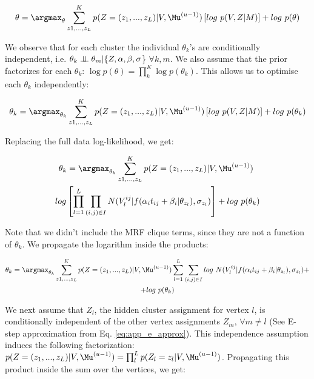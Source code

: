 \begin{equation}
 \theta = \argmax_{\theta} \sum_{z1,\dots, z_L}^K p(Z = (z_1, ..., z_L) | V, \Mu^{(u-1)}) \left[ log\ p(V,Z|M) \right] + log\ p(\theta)
\end{equation}

We observe that for each cluster the individual $\theta_k$'s are conditionally independent, i.e. $\theta_k \perp\!\!\!\perp \theta_m | \{Z, \alpha, \beta, \sigma$\} $\forall k,m$. We also assume that the prior factorizes for each $\theta_k$: $\log p(\theta) = \prod_k^K \log p(\theta_k)$. This allows us to optimise each $\theta_k$ independently:

\begin{equation}
 \theta_k = \argmax_{\theta_k} \sum_{z1,\dots, z_L}^K p(Z = (z_1, ..., z_L) | V, \Mu^{(u-1)}) \left[ log\ p(V,Z|M) \right] + log\ p(\theta_k)
\end{equation}

Replacing the full data log-likelihood, we get:

\begin{multline}
 \theta_k = \argmax_{\theta_k} \sum_{z1,\dots, z_L}^K p(Z = (z_1, ..., z_L) | V, \Mu^{(u-1)})\ \\ log \left[ \prod_{l=1}^L \prod_{(i,j) \in I} N(V_l^{ij} | f(\alpha_i t_{ij} + \beta_i | \theta_{z_l}), \sigma_{z_l}) \right]  + log\ p(\theta_k)
\end{multline}

Note that we didn't include the MRF clique terms, since they are not a function of $\theta_k$. We propagate the logarithm inside the products:

\begin{multline}
 \theta_k = \argmax_{\theta_k} \sum_{z1,\dots, z_L}^K p(Z = (z_1, ..., z_L) | V, \Mu^{(u-1)}) \sum_{l=1}^L \sum_{(i,j) \in I} log\ N(V_l^{ij} | f(\alpha_i t_{ij} + \beta_i | \theta_{z_l}), \sigma_{z_l}) + \\ + log\ p(\theta_k)
\end{multline}

\begin{sloppypar}
We next assume that $Z_l$, the hidden cluster assignment for vertex $l$, is conditionally independent of the other vertex assignments $Z_m$, $\forall m \neq l$ (See E-step approximation from Eq. \ref{eq:app_e_approx}). This independence assumption induces the following factorization: ${p(Z = (z_1, ..., z_L) | V, \Mu^{(u-1)}) = \prod_l^L p(Z_l = z_l | V, \Mu^{(u-1)})}$. Propagating this product inside the sum over the vertices, we get:
\end{sloppypar}


